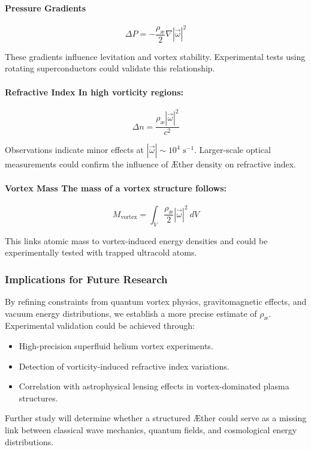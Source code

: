 \documentclass[a4paper,10pt]{article}
\begin{document}
\paragraph{Pressure Gradients}

\begin{equation*}
\Delta P = -\frac{\rho_\text{\ae}}{2} \nabla |\vec{\omega}|^2
\end{equation*}

These gradients influence levitation and vortex stability. Experimental tests using rotating superconductors could validate this relationship.

\paragraph{Refractive Index In high vorticity regions:}

\begin{equation*}
\Delta n = \frac{\rho_\text{\ae} |\vec{\omega}|^2}{c^2}
\end{equation*}

Observations indicate minor effects at $|\vec{\omega}| \sim 10^4 \text{ s}^{-1}$. Larger-scale optical measurements could confirm the influence of Æther density on refractive index.

\paragraph{Vortex Mass The mass of a vortex structure follows:}

\begin{equation*}
M_\text{vortex} = \int_V \frac{\rho_\text{\ae}}{2} | \vec{\omega}|^2 \ dV
\end{equation*}

This links atomic mass to vortex-induced energy densities and could be experimentally tested with trapped ultracold atoms.


\subsubsection*{Implications for Future Research}
By refining constraints from quantum vortex physics, gravitomagnetic effects, and vacuum energy distributions, we establish a more precise estimate of $ \rho_\text{\ae} $. Experimental validation could be achieved through:
\begin{itemize}
    \item High-precision superfluid helium vortex experiments.
    \item Detection of vorticity-induced refractive index variations.
    \item Correlation with astrophysical lensing effects in vortex-dominated plasma structures.
\end{itemize}
Further study will determine whether a structured Æther could serve as a missing link between classical wave mechanics, quantum fields, and cosmological energy distributions.
\end{document}
